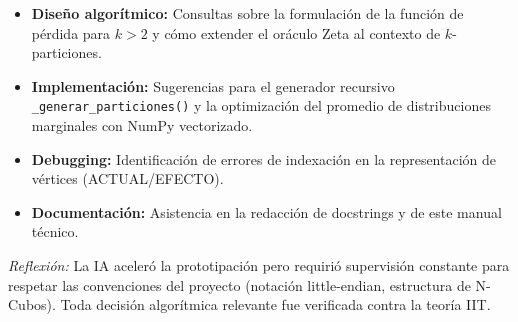 \begin{itemize}[itemsep=4pt]
    \item \textbf{Diseño algorítmico:} Consultas sobre la formulación de la función de pérdida para $k > 2$ y cómo extender el oráculo Zeta al contexto de $k$-particiones.
    \item \textbf{Implementación:} Sugerencias para el generador recursivo \texttt{\_generar\_particiones()} y la optimización del promedio de distribuciones marginales con NumPy vectorizado.
    \item \textbf{Debugging:} Identificación de errores de indexación en la representación de vértices (ACTUAL/EFECTO).
    \item \textbf{Documentación:} Asistencia en la redacción de docstrings y de este manual técnico.
\end{itemize}

\textit{Reflexión:} La IA aceleró la prototipación pero requirió supervisión constante para respetar las convenciones del proyecto (notación little-endian, estructura de N-Cubos). Toda decisión algorítmica relevante fue verificada contra la teoría IIT.
